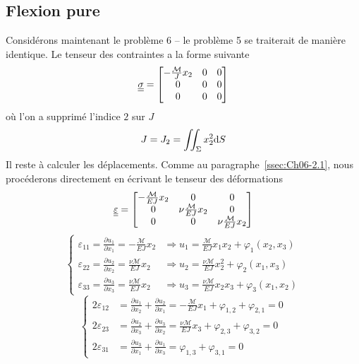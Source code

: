 \subsection{Flexion pure}
Considérons maintenant le problème 6 -- le problème 5 se traiterait de manière identique.
Le tenseur des contraintes a la forme suivante
\begin{equation}
    \underline{\underline{\sigma}} = 
    \begin{bmatrix}
        -\frac{\mathcal{M}}{J}x_2 & 0 & 0 \\
        0 & 0 & 0 \\
        0 & 0 & 0
    \end{bmatrix}
    \label{eq:Ch06-025}
\end{equation}
où l'on a supprimé l'indice $2$ sur $J$
\begin{equation}
    J=J_2 = \iint_{\Sigma} x_2^2 \mathrm{d} S
    \label{eq:Ch06-026}
\end{equation}
Il reste à calculer les déplacements.
Comme au paragraphe~\ref{ssec:Ch06-2.1}, nous procéderons directement en écrivant le tenseur des déformations
\begin{equation}
    \underline{\underline{\varepsilon}} = 
    \begin{bmatrix}
        -\frac{\mathcal{M}}{EJ}x_2 & 0 & 0 \\
        0 & \nu\frac{\mathcal{M}}{EJ}x_2 & 0 \\
        0 & 0 & \nu\frac{\mathcal{M}}{EJ}x_2
    \end{bmatrix}
    \label{eq:Ch06-027}
\end{equation}
\begin{equation}
    \left\{
    \begin{aligned}
        \varepsilon_{11} = \frac{\partial u_1}{\partial x_1} = -\frac{\mathcal{M}}{EJ}x_2 & \Rightarrow u_1 = \frac{\mathcal{M}}{EJ}x_1x_2 + \varphi_1 \left( x_2,x_3 \right) \\
        \varepsilon_{22} = \frac{\partial u_2}{\partial x_2} = \frac{\nu\mathcal{M}}{EJ}x_2 & \Rightarrow u_2 = \frac{\nu\mathcal{M}}{EJ}x_2^2 + \varphi_2 \left( x_1,x_3 \right) \\
        \varepsilon_{33} = \frac{\partial u_3}{\partial x_3} = \frac{\nu\mathcal{M}}{EJ}x_2 & \Rightarrow u_3 = \frac{\nu\mathcal{M}}{EJ}x_2x_3 + \varphi_3 \left( x_1,x_2 \right)
    \end{aligned}
    \right.
    \label{eq:Ch07-028}
\end{equation}
\begin{equation}
    \left\{
    \begin{aligned}
        2 \varepsilon_{12} &= \frac{\partial u_1}{\partial x_2} + \frac{\partial u_2}{\partial x_1} = - \frac{\mathcal{M}}{EJ}x_1 + \varphi_{1,2} + \varphi_{2,1} = 0 \\
        2 \varepsilon_{23} &= \frac{\partial u_2}{\partial x_3} + \frac{\partial u_3}{\partial x_2} = \frac{\nu\mathcal{M}}{EJ}x_3 + \varphi_{2,3} + \varphi_{3,2} = 0 \\
        2 \varepsilon_{31} &= \frac{\partial u_3}{\partial x_1} + \frac{\partial u_1}{\partial x_3} = \varphi_{1,3} + \varphi_{3,1} = 0
    \end{aligned}
    \right.
    \label{eq:Ch07-029}
\end{equation}
